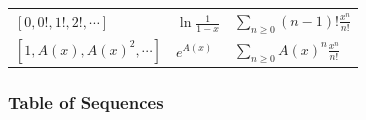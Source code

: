 \begin{longtable}[]{@{}lll@{}}
\begin{minipage}[t]{0.30\columnwidth}
\([0, 0!, 1!, 2!, \cdots ]\)\strut
\end{minipage} & \begin{minipage}[t]{0.30\columnwidth}\raggedright
\(\ln \frac{1}{1-x}\)\strut
\end{minipage} & \begin{minipage}[t]{0.30\columnwidth}\raggedright
\(\displaystyle\sum_{n \geq 0}(n-1)! \frac{x^n}{n!}\)\strut
\end{minipage}\tabularnewline
\begin{minipage}[t]{0.30\columnwidth}\raggedright
\([1, A(x), A(x)^2, \cdots ]\)\strut
\end{minipage} & \begin{minipage}[t]{0.30\columnwidth}\raggedright
\(e^{A(x)}\)\strut
\end{minipage} & \begin{minipage}[t]{0.30\columnwidth}\raggedright
\(\displaystyle\sum_{n\geq 0} A(x)^n \frac{x^n}{n!}\)\strut
\end{minipage}\tabularnewline
\bottomrule
\end{longtable}

\newpage

\hypertarget{table-of-sequences}{%
\subsubsection{Table of Sequences}\label{table-of-sequences}}

